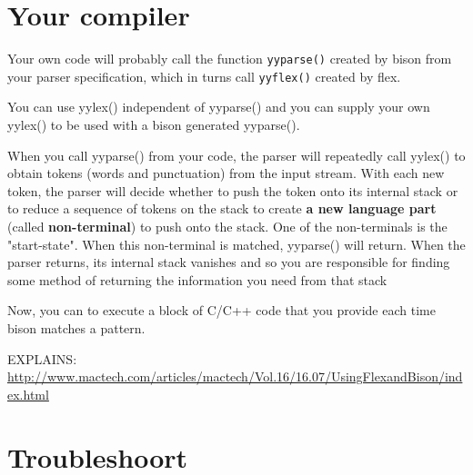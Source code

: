 \section{Your compiler}

Your own code will probably call the function \verb!yyparse()! created by bison
from your parser specification, which in turns call \verb!yyflex()! created by
flex.

You can use yylex() independent of yyparse() and you can supply your own yylex()
to be used with a bison generated yyparse(). 


When you call yyparse() from your code, the parser will repeatedly call yylex()
to obtain tokens (words and punctuation) from the input stream. With each new
token, the parser will decide whether to push the token onto its internal stack
or to reduce a sequence of tokens on the stack to create {\bf a new language
part} (called {\bf non-terminal}) to push onto the stack. 
One of the non-terminals is the "start-state". When this non-terminal is
matched, yyparse() will return.
When the parser returns, its internal stack vanishes and so you are responsible
for finding some method of returning the information you need from that stack

Now, you can to execute a block of C/C++ code that you provide each time bison
matches a pattern.

EXPLAINS:
\url{http://www.mactech.com/articles/mactech/Vol.16/16.07/UsingFlexandBison/index.html}
	
\section{Troubleshoort}

